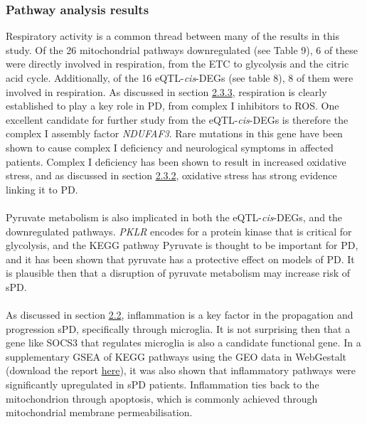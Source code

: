 \documentclass{article}
\begin{document}
\subsubsection{Pathway analysis results}
Respiratory activity is a common thread between many of the results in this study. Of the 26 mitochondrial pathways downregulated (see Table 9), 6 of these were directly involved in respiration, from the ETC to glycolysis and the citric acid cycle. Additionally, of the 16 eQTL-\textit{cis}-DEGs (see table 8), 8 of them were involved in respiration. As discussed in section \hyperref[para:oxidative]{2.3.3}, respiration is clearly established to play a key role in PD, from complex I inhibitors\cite{Langston1983ChronicSynthesis} to ROS\cite{Subramaniam2013MitochondrialDisease}. One excellent candidate for further study from the eQTL-\textit{cis}-DEGs is therefore the complex I assembly factor \textit{NDUFAF3}. Rare mutations in this gene have been shown to cause complex I deficiency\cite{vanderVen2023ExpandingDisease} and neurological symptoms in affected patients. Complex I deficiency has been shown to result in increased oxidative stress\cite{Leman2015AssemblyDeficiency}, and as discussed in section \hyperref[para:oxidative]{2.3.2}, oxidative stress has strong evidence linking it to PD\cite{Subramaniam2013MitochondrialDisease}\cite{Gonzalez-Rodriguez2021DisruptionParkinsonism}.
\\
\\
Pyruvate metabolism is also implicated in both the eQTL-\textit{cis}-DEGs, and the downregulated pathways. \textit{PKLR} encodes for a protein kinase that is critical for glycolysis, and the KEGG pathway  Pyruvate is thought to be important for PD\cite{Gray2014RegulationDisease}, and it has been shown that pyruvate has a protective effect on models of PD\cite{Kim2022PyruvateDisease}. It is plausible then that a disruption of pyruvate metabolism may increase risk of sPD.
\\
\\As discussed in section \hyperref[subsec:inflammation]{2.2}, inflammation is a key factor in the propagation and progression sPD, specifically through microglia\cite{Isik2023MicrogliaDisease}. It is not surprising then that a gene like SOCS3 that regulates microglia\cite{Wang2024SOCS3Macrophages} is also a candidate functional gene. In a supplementary GSEA of KEGG pathways using the GEO data in WebGestalt\cite{Elizarraras2024WebGestaltMulti-omics} (download the report \href{https://github.com/Thomas-brightwell/PD-MSc-project-code/blob/main/Thesis/Supplementary%20materials/KEGG_GSEA.zip}{here}), it was also shown that inflammatory pathways were significantly upregulated in sPD patients. Inflammation ties back to the mitochondrion through apoptosis\cite{Vringer2023MitochondriaInflammation}, which is commonly achieved through mitochondrial membrane permeabilisation.
\end{document}
